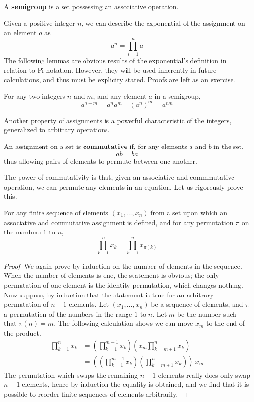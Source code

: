 \begin{definition}
    A {\bf semigroup} is a set possessing an associative operation.
\end{definition}

Given a positive integer $n$, we can describe the exponential of the assignment on an element $a$ as
%
\[ a^n = \prod_{i = 1}^n a \]
%
The following lemmas are obvious results of the exponential's definition in relation to Pi notation. However, they will be used inherently in future calculations, and thus must be explicity stated. Proofs are left as an exercise.

\begin{lemma} For any two integers $n$ and $m$, and any element $a$ in a semigroup,
\[ a^{n+m} = a^n a^m\ \ \ \ \ (a^n)^m = a^{nm} \]
\end{lemma}

Another property of assignments is a powerful characteristic of the integers, generalized to arbitrary operations.

\begin{definition} An assignment on a set is {\bf commutative} if, for any elements $a$ and $b$ in the set,
%
\[ ab = ba \]
%
thus allowing pairs of elements to permute between one another.
\end{definition}

The power of commutativity is that, given an associative and commmutative operation, we can permute any elements in an equation. Let us rigorously prove this.

\begin{theorem}
    For any finite sequence of elements $(x_1, \dots, x_n)$ from a set upon which an associative and commutative assignment is defined, and for any permutation $\pi$ on the numbers $1$ to $n$,
    \[ \prod_{k=1}^n x_k = \prod_{k=1}^n x_{\pi(k)} \]
\end{theorem}
\begin{proof}
    We again prove by induction on the number of elements in the sequence. When the number of elements is one, the statement is obvious; the only permutation of one element is the identity permutation, which changes nothing. Now suppose, by induction that the statement is true for an arbitrary permutation of $n-1$ elements. Let $(x_1, \dots, x_n)$ be a sequence of elements, and $\pi$ a permutation of the numbers in the range $1$ to $n$. Let $m$ be the number such that $\pi(n) = m$. The following calculation shows we can move $x_m$ to the end of the product.
    \begin{align}
    \prod_{k=1}^n x_k &= \left( \prod_{k=1}^{m-1} x_k \right) \left( x_m \prod_{k=m+1}^n x_k \right)\\
    &= \left( \left( \prod_{k=1}^{m-1} x_k \right) \left( \prod_{k=m+1}^n x_k \right) \right)\ x_m
    \end{align}
    The permutation which swaps the remaining $n-1$ elements really does only swap $n-1$ elements, hence by induction the equality is obtained, and we find that it is possible to reorder finite sequences of elements arbitrarily.
\end{proof}

